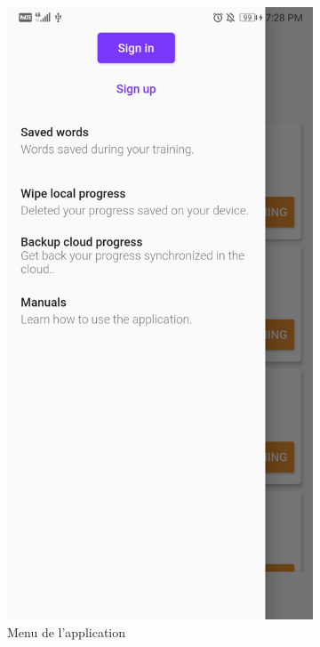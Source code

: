 \begin{appendices}
\begin{landscape}
\begin{figure}[h]
  \begin{subfigure}{.25\textwidth}
    \centering
    \includegraphics[width=.75\linewidth]{content/imgs/screen9.jpg}
    \caption{Menu de l'application}
  \end{subfigure}%
  \begin{subfigure}{.25\textwidth}
    \centering

\end{subfigure}
\end{figure}
\end{landscape}
\end{appendices}
